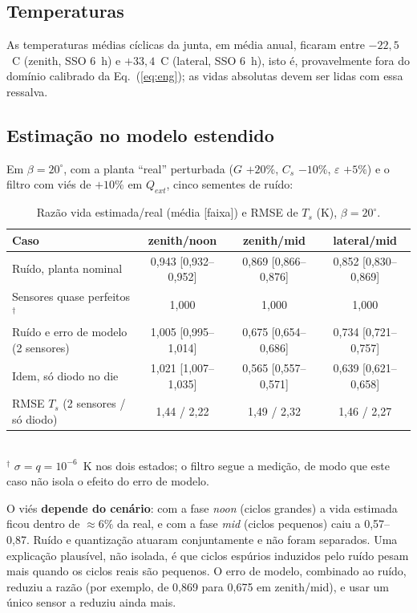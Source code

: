 \documentclass[12pt,a4paper]{article}
\begin{document}
\subsection{Temperaturas}
As temperaturas médias cíclicas da junta, em média anual, ficaram entre
$-22{,}5$~\textdegree C (zenith, SSO 6~h) e $+33{,}4$~\textdegree C (lateral,
SSO 6~h), isto é, provavelmente fora do domínio calibrado da
Eq.~(\ref{eq:eng}); as vidas absolutas devem ser lidas com essa ressalva.

\subsection{Estimação no modelo estendido}\label{sec:ekfext}
Em $\beta=20^\circ$, com a planta ``real'' perturbada ($G$ $+20\%$, $C_s$
$-10\%$, $\varepsilon$ $+5\%$) e o filtro com viés de $+10\%$ em $Q_{ext}$,
cinco sementes de ruído:
\begin{table}[h]\centering\small
\caption{Razão vida estimada/real (média [faixa]) e RMSE de $T_s$ (K), $\beta=20^\circ$.}
\label{tab:ekfext}
\begin{tabular}{@{}lccc@{}}\toprule
Caso & zenith/noon & zenith/mid & lateral/mid\\\midrule
Ruído, planta nominal & 0,943 [0,932--0,952] & 0,869 [0,866--0,876] & 0,852 [0,830--0,869]\\
Sensores quase perfeitos$^\dagger$ & 1,000 & 1,000 & 1,000\\
Ruído e erro de modelo (2 sensores) & 1,005 [0,995--1,014] & 0,675 [0,654--0,686] & 0,734 [0,721--0,757]\\
Idem, só diodo no die & 1,021 [1,007--1,035] & 0,565 [0,557--0,571] & 0,639 [0,621--0,658]\\
RMSE $T_s$ (2 sensores / só diodo) & 1,44 / 2,22 & 1,49 / 2,32 & 1,46 / 2,27\\
\bottomrule\end{tabular}\\[2pt]
{\footnotesize $^\dagger$ $\sigma=q=10^{-6}$~K nos dois estados; o filtro segue a
medição, de modo que este caso não isola o efeito do erro de modelo.}\end{table}
O viés \textbf{depende do cenário}: com a fase \emph{noon} (ciclos grandes) a
vida estimada ficou dentro de $\approx6\%$ da real, e com a fase \emph{mid}
(ciclos pequenos) caiu a 0,57--0,87. Ruído e quantização atuaram
conjuntamente e não foram separados. Uma explicação plausível, não isolada, é
que ciclos espúrios induzidos pelo ruído pesam mais quando os ciclos reais são
pequenos. O erro de modelo, combinado ao ruído, reduziu a razão (por exemplo,
de 0,869 para 0,675 em zenith/mid), e usar um único sensor a reduziu ainda mais.
\end{document}
